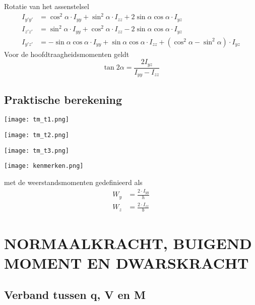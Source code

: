             Rotatie van het assenstelsel
            \begin{align}
                I_{y'y'} &= \cos^2\alpha\cdot I_{yy}+\sin^2\alpha\cdot I_{zz} + 2\sin\alpha\cos\alpha\cdot I_{yz}\nonumber\\
                I_{z'z'} &= \sin^2\alpha\cdot I_{yy}+\cos^2\alpha\cdot I_{zz} - 2\sin\alpha\cos\alpha\cdot I_{yz}\nonumber\\
                I_{y'z'} &= -\sin\alpha\cos\alpha\cdot I_{yy} + \sin\alpha\cos\alpha\cdot I_{zz} + \left(\cos^2\alpha - \sin^2\alpha\right)\cdot I_{yz}\nonumber
            \end{align}
            Voor de hoofdtraagheidsmomenten geldt
            \begin{equation}
                \tan 2\alpha = \frac{2I_{yz}}{I_{yy} - I_{zz}}
            \end{equation}
        
        \subsection{Praktische berekening}

            \begin{center}
                \texttt{[image: tm\_t1.png]}

                \texttt{[image: tm\_t2.png]}

                \texttt{[image: tm\_t3.png]}
            \end{center}
            \pagebreak
            \begin{center}
                \texttt{[image: kenmerken.png]}
            \end{center}
            met de weerstandsmomenten gedefinieerd als
            \begin{align}
                W_{y} &= \frac{2\cdot I_{yy}}{h}\nonumber\\
                W_{z} &= \frac{2\cdot I_{zz}}{b}\nonumber
            \end{align}
        
    \section{NORMAALKRACHT, BUIGEND MOMENT EN DWARSKRACHT}

        \subsection{Verband tussen q, V en M}

